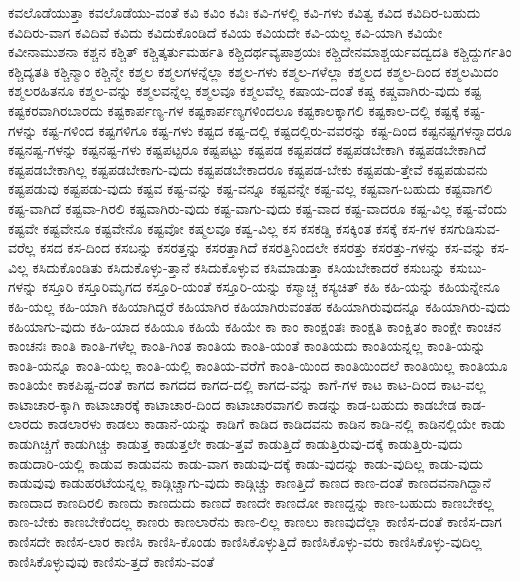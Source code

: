 {ಕವಲೊಡೆಯುತ್ತಾ
ಕವಲೊಡೆಯು-ವಂತೆ
ಕವಿ
ಕವಿಂ
ಕವಿಃ
ಕವಿ-ಗಳಲ್ಲಿ
ಕವಿ-ಗಳು
ಕವಿತ್ವ
ಕವಿದ
ಕವಿದಿರ-ಬಹುದು
ಕವಿದಿರು-ವಾಗ
ಕವಿದಿವೆ
ಕವಿದು
ಕವಿದುಕೊಂಡಿದೆ
ಕವಿಯ
ಕವಿಯದೇ
ಕವಿ-ಯಲ್ಲ
ಕವಿ-ಯಾಗಿ
ಕವಿಯೇ
ಕವೀನಾಮುಶನಾ
ಕಶ್ಚನ
ಕಶ್ಚಿತ್
ಕಶ್ಚಿತ್ಕರ್ತುಮರ್ಹತಿ
ಕಶ್ಚಿದರ್ಥವ್ಯಪಾಶ್ರಯಃ
ಕಶ್ಚಿದೇನಮಾಶ್ಚರ್ಯವದ್ವದತಿ
ಕಶ್ಚಿದ್ದುರ್ಗತಿಂ
ಕಶ್ಚಿದ್ಯತತಿ
ಕಶ್ಚಿನ್ಮಾಂ
ಕಶ್ಚಿನ್ಮೇ
ಕಶ್ಮಲ
ಕಶ್ಮಲಗಳನ್ನೆಲ್ಲಾ
ಕಶ್ಮಲ-ಗಳು
ಕಶ್ಮಲ-ಗಳೆಲ್ಲಾ
ಕಶ್ಮಲದ
ಕಶ್ಮಲ-ದಿಂದ
ಕಶ್ಮಲಮಿದಂ
ಕಶ್ಮಲರಹಿತನೂ
ಕಶ್ಮಲ-ವನ್ನು
ಕಶ್ಮಲವನ್ನೆಲ್ಲ
ಕಶ್ಮಲವೂ
ಕಶ್ಮಲವೆಲ್ಲ
ಕಷಾಯ-ದಂತೆ
ಕಷ್ಚ
ಕಷ್ಚವಾಗಿರು-ವುದು
ಕಷ್ಟ
ಕಷ್ಟಕರವಾಗಿರಬಾರದು
ಕಷ್ಟಕಾರ್ಪಣ್ಯ-ಗಳ
ಕಷ್ಟಕಾರ್ಪಣ್ಯಗಳಿಂದಲೂ
ಕಷ್ಟಕಾಲಕ್ಕಾಗಲಿ
ಕಷ್ಟಕಾಲ-ದಲ್ಲಿ
ಕಷ್ಟಕ್ಕೆ
ಕಷ್ಟ-ಗಳನ್ನು
ಕಷ್ಟ-ಗಳಿಂದ
ಕಷ್ಟಗಳಿಗೂ
ಕಷ್ಟ-ಗಳು
ಕಷ್ಟದ
ಕಷ್ಟ-ದಲ್ಲಿ
ಕಷ್ಟದಲ್ಲಿರು-ವವರನ್ನು
ಕಷ್ಟ-ದಿಂದ
ಕಷ್ಟನಷ್ಟಗಳನ್ನಾದರೂ
ಕಷ್ಟನಷ್ಟ-ಗಳನ್ನು
ಕಷ್ಟನಷ್ಟ-ಗಳು
ಕಷ್ಟಪಟ್ಟರೂ
ಕಷ್ಟಪಟ್ಟು
ಕಷ್ಟಪಡ
ಕಷ್ಟಪಡದೆ
ಕಷ್ಟಪಡಬೇಕಾಗಿ
ಕಷ್ಟಪಡಬೇಕಾಗಿದೆ
ಕಷ್ಟಪಡಬೇಕಾಗಿಲ್ಲ
ಕಷ್ಟಪಡಬೇಕಾಗು-ವುದು
ಕಷ್ಟಪಡಬೇಕಾದರೂ
ಕಷ್ಟಪಡ-ಬೇಕು
ಕಷ್ಟಪಡು-ತ್ತೇವೆ
ಕಷ್ಟಪಡುವನು
ಕಷ್ಟಪಡುವು
ಕಷ್ಟಪಡು-ವುದು
ಕಷ್ಟವ
ಕಷ್ಟ-ವನ್ನು
ಕಷ್ಟ-ವನ್ನೂ
ಕಷ್ಟವನ್ನೇ
ಕಷ್ಟ-ವಲ್ಲ
ಕಷ್ಟವಾಗ-ಬಹುದು
ಕಷ್ಟವಾಗಲಿ
ಕಷ್ಟ-ವಾಗಿದೆ
ಕಷ್ಟವಾ-ಗಿರಲಿ
ಕಷ್ಟವಾಗಿರು-ವುದು
ಕಷ್ಟ-ವಾಗು-ವುದು
ಕಷ್ಟ-ವಾದ
ಕಷ್ಟ-ವಾದರೂ
ಕಷ್ಟ-ವಿಲ್ಲ
ಕಷ್ಟ-ವೆಂದು
ಕಷ್ಟವೇ
ಕಷ್ಟವೇನೂ
ಕಷ್ಟವೇನೊ
ಕಷ್ಟವೋ
ಕಷ್ಮಲವೂ
ಕಷ್ವ-ವಿಲ್ಲ
ಕಸ
ಕಸಕಡ್ಡಿ
ಕಸಕ್ಕಿಂತ
ಕಸಕ್ಕೆ
ಕಸ-ಗಳ
ಕಸಗುಡಿಸುವ-ವರೆಲ್ಲ
ಕಸದ
ಕಸ-ದಿಂದ
ಕಸಬನ್ನು
ಕಸರತ್ತನ್ನು
ಕಸರತ್ತಾಗಿದೆ
ಕಸರತ್ತಿನಿಂದಲೇ
ಕಸರತ್ತು
ಕಸರತ್ತು-ಗಳನ್ನು
ಕಸ-ವನ್ನು
ಕಸ-ವಿಲ್ಲ
ಕಸಿದುಕೊಂಡಿತು
ಕಸಿದುಕೊಳ್ಳು-ತ್ತಾನೆ
ಕಸಿದುಕೊಳ್ಳುವ
ಕಸಿಮಾಡುತ್ತಾ
ಕಸಿಯಬೇಕಾದರೆ
ಕಸುಬನ್ನು
ಕಸುಬು-ಗಳನ್ನು
ಕಸ್ತೂರಿ
ಕಸ್ತೂರಿಮೃಗದ
ಕಸ್ತೂರಿ-ಯಂತೆ
ಕಸ್ತೂರಿ-ಯನ್ನು
ಕಸ್ಮಾಚ್ಚ
ಕಸ್ಯಚಿತ್
ಕಹಿ
ಕಹಿ-ಯನ್ನು
ಕಹಿಯನ್ನೇನೂ
ಕಹಿ-ಯಲ್ಲ
ಕಹಿ-ಯಾಗಿ
ಕಹಿಯಾಗಿದ್ದರೆ
ಕಹಿಯಾಗಿರ
ಕಹಿಯಾಗಿರುವಂತಹ
ಕಹಿಯಾಗಿರುವುದನ್ನೂ
ಕಹಿಯಾಗಿರು-ವುದು
ಕಹಿಯಾಗು-ವುದು
ಕಹಿ-ಯಾದ
ಕಹಿಯೂ
ಕಹಿಯೆ
ಕಹಿಯೇ
ಕಾ
ಕಾಂ
ಕಾಂಕ್ಷಂತಃ
ಕಾಂಕ್ಷತಿ
ಕಾಂಕ್ಷಿತಂ
ಕಾಂಕ್ಷೇ
ಕಾಂಚನ
ಕಾಂಚನಃ
ಕಾಂತಿ
ಕಾಂತಿ-ಗಳೆಲ್ಲ
ಕಾಂತಿ-ಗಿಂತ
ಕಾಂತಿಯ
ಕಾಂತಿ-ಯಂತೆ
ಕಾಂತಿಯದು
ಕಾಂತಿಯನ್ನಲ್ಲ
ಕಾಂತಿ-ಯನ್ನು
ಕಾಂತಿ-ಯನ್ನೂ
ಕಾಂತಿ-ಯಲ್ಲ
ಕಾಂತಿ-ಯಲ್ಲಿ
ಕಾಂತಿಯ-ವರೆಗೆ
ಕಾಂತಿ-ಯಿಂದ
ಕಾಂತಿಯಿಂದಲೆ
ಕಾಂತಿಯಿಲ್ಲ
ಕಾಂತಿಯೂ
ಕಾಂತಿಯೇ
ಕಾಕಪಿಷ್ಟ-ದಂತೆ
ಕಾಗದ
ಕಾಗದದ
ಕಾಗದ-ದಲ್ಲಿ
ಕಾಗದ-ವನ್ನು
ಕಾಗೆ-ಗಳ
ಕಾಟ
ಕಾಟ-ದಿಂದ
ಕಾಟ-ವಲ್ಲ
ಕಾಟಾಚಾರ-ಕ್ಕಾಗಿ
ಕಾಟಾಚಾರಕ್ಕೆ
ಕಾಟಾಚಾರ-ದಿಂದ
ಕಾಟಾಚಾರವಾಗಲಿ
ಕಾಡನ್ನು
ಕಾಡ-ಬಹುದು
ಕಾಡಬೇಡ
ಕಾಡ-ಲಾರದು
ಕಾಡಲಾರಳು
ಕಾಡಲು
ಕಾಡಾನೆ-ಯನ್ನು
ಕಾಡಿಗೆ
ಕಾಡಿದ
ಕಾಡಿದವನು
ಕಾಡಿನ
ಕಾಡಿ-ನಲ್ಲಿ
ಕಾಡಿನಲ್ಲಿಯೇ
ಕಾಡು
ಕಾಡುಗಿಚ್ಚಿಗೆ
ಕಾಡುಗಿಚ್ಚು
ಕಾಡುತ್ತ
ಕಾಡುತ್ತಲೇ
ಕಾಡು-ತ್ತವೆ
ಕಾಡುತ್ತಿದೆ
ಕಾಡುತ್ತಿರುವು-ದಕ್ಕೆ
ಕಾಡುತ್ತಿರು-ವುದು
ಕಾಡುದಾರಿ-ಯಲ್ಲಿ
ಕಾಡುವ
ಕಾಡುವನು
ಕಾಡು-ವಾಗ
ಕಾಡುವು-ದಕ್ಕೆ
ಕಾಡು-ವುದನ್ನು
ಕಾಡು-ವುದಿಲ್ಲ
ಕಾಡು-ವುದು
ಕಾಡುವುವು
ಕಾಡುಹರಟೆಯನ್ನಲ್ಲ
ಕಾಡ್ಗಿಚ್ಚಾಗು-ವುದು
ಕಾಡ್ಗಿಚ್ಚು
ಕಾಣತ್ತಿದೆ
ಕಾಣದ
ಕಾಣ-ದಂತೆ
ಕಾಣದವನಾಗಿದ್ದಾನೆ
ಕಾಣದಾದ
ಕಾಣದಿರಲಿ
ಕಾಣದು
ಕಾಣದುದು
ಕಾಣದೆ
ಕಾಣದೇ
ಕಾಣದೋ
ಕಾಣದ್ದನ್ನು
ಕಾಣ-ಬಹುದು
ಕಾಣಬೇಕಲ್ಲ
ಕಾಣ-ಬೇಕು
ಕಾಣಬೇಕೆಂದಲ್ಲ
ಕಾಣರು
ಕಾಣಲಾರೆನು
ಕಾಣ-ಲಿಲ್ಲ
ಕಾಣಲು
ಕಾಣವುದೆಲ್ಲಾ
ಕಾಣಿಸ-ದಂತೆ
ಕಾಣಿಸ-ದಾಗ
ಕಾಣಿಸದೇ
ಕಾಣಿಸ-ಲಾರ
ಕಾಣಿಸಿ
ಕಾಣಿಸಿ-ಕೊಂಡು
ಕಾಣಿಸಿಕೊಳ್ಳುತ್ತಿದೆ
ಕಾಣಿಸಿಕೊಳ್ಳು-ವರು
ಕಾಣಿಸಿಕೊಳ್ಳು-ವುದಿಲ್ಲ
ಕಾಣಿಸಿಕೊಳ್ಳುವುವು
ಕಾಣಿಸು-ತ್ತದೆ
ಕಾಣಿಸು-ವಂತೆ
}
